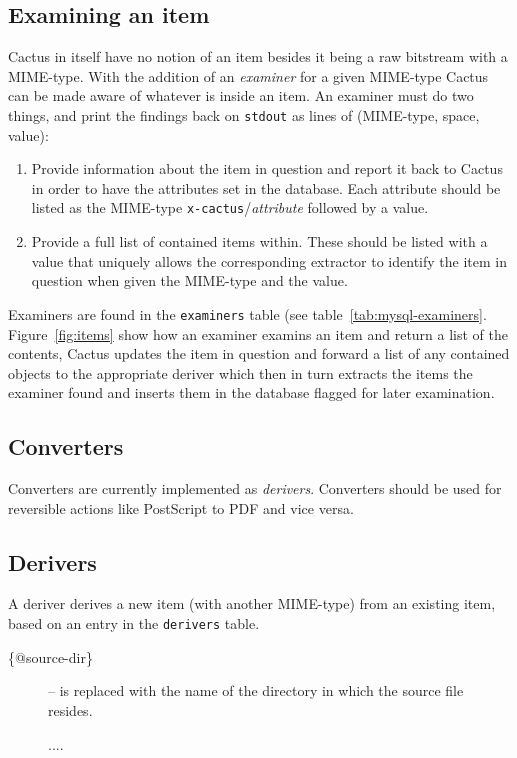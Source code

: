\subsection{Examining an item}

Cactus in itself have no notion of an item besides it being
a raw bitstream with a MIME-type.  With the addition of an \textit{examiner} for a given MIME-type
Cactus can be made aware of whatever is inside an
item.  An examiner must do two things, and print the
findings back on \texttt{stdout} as lines of 
(MIME-type, space, value):

\begin{enumerate}
\item Provide information about the item in question and report it
  back to Cactus in order to have the attributes set in the database.
  Each attribute should be listed as the MIME-type
  \texttt{x-cactus}/\textit{attribute} followed by a value.
  
\item Provide a full list of contained items within.  These should be
  listed with a value that uniquely allows the corresponding extractor
  to identify the item in question when given the MIME-type and the
  value.
\end{enumerate}

Examiners are found in the \texttt{examiners} table (see
table~\vref{tab:mysql-examiners}.  Figure~\vref{fig:items}
show how an examiner examins an item and return a list of
the contents, Cactus updates the item in question and
forward a list of any contained objects to the appropriate
deriver which then in turn extracts the items the examiner
found and inserts them in the database flagged for later
examination.



\subsection{Converters}

Converters are currently implemented as \textit{derivers}.
Converters should be used for reversible actions like
PostScript to PDF and vice versa.

\subsection{Derivers}

A deriver derives a new item (with another MIME-type) from
an existing item, based on an entry in the \texttt{derivers}
table.
\begin{description}
\item[\{@source-dir\}]  -- is replaced with the name of the directory in which the source file resides.  

\textsf{....}


\end{description}

